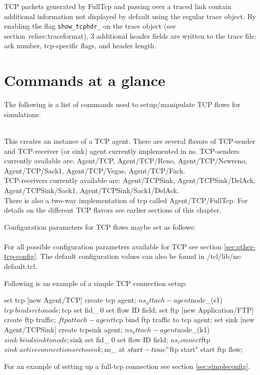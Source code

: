 TCP packets generated by FullTcp and
passing over a traced link contain additional information not displayed
by default using the regular trace object.
By enabling the flag {\tt show\_tcphdr\_} on the trace object
(see section~ref{sec:traceformat}), 3 additional header fields are
written to the trace file: ack number, tcp-specific flags, and header length.


\section{Commands at a glance}
\label{sec:tcpcommand}

The following is a list of commands used to setup/manipulate TCP flows
for simulations:
\begin{flushleft}
\\
This creates an instance of a TCP agent. There are several flavors of
TCP-sender and TCP-receiver (or sink) agent currently implemented in ns.
TCP-senders currently available are:
Agent/TCP, Agent/TCP/Reno, Agent/TCP/Newreno, Agent/TCP/Sack1, Agent/TCP/Vegas,
Agent/TCP/Fack. \\
TCP-receivers currently available are:
Agent/TCPSink, Agent/TCPSink/DelAck, Agent/TCPSink/Sack1,
Agent/TCPSink/Sack1/DelAck.\\
There is also a two-way implementation of tcp called Agent/TCP/FullTcp. For
details on the different TCP flavors see earlier sections of this chapter.


Configuration parameters for TCP flows maybe set as follows:\\
\\
For all possible configuration parameters available for TCP see section
\ref{sec:other-tcp-config}. The default configuration values can also be
found in \ns/tcl/lib/ns-default.tcl.


Following is an example of a simple TCP connection setup:
\begin{program}
set tcp [new Agent/TCP] \; create tcp agent;
$ns_ attach-agent $node_(s1) $tcp \; bind src to node;
$tcp set fid_ 0   \; set flow ID field;
set ftp [new Application/FTP]   \; create ftp traffic;
$ftp attach-agent $tcp  \; bind ftp traffic to tcp agent;
set sink [new Agent/TCPSink] \; create tcpsink agent;
$ns_ attach-agent $node_(k1) $sink \; bind sink to node;
$sink set fid_ 0  \; set flow ID field;
$ns_ connect $ftp $sink \; active connection src to sink;
$ns_ at $start-time "$ftp start"  \; start ftp flow;
\end{program}

For an example of setting up a full-tcp connection see section
\ref{sec:simpleconfig}.

\end{flushleft}

\endinput
